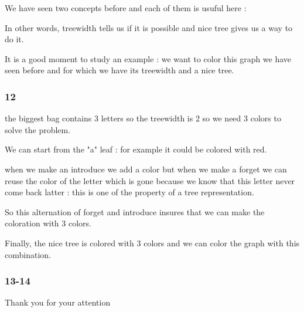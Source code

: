 \documentclass[a4paper, 10pt,french,landscape]{article}
\begin{document}
\begin{multicols}{3}
We have seen two concepts before and each of them is usuful here : 


In other words, treewidth tells us if it is possible and nice tree gives us a way to do it.

It is a good moment to study an example : we want to color this graph we have seen before and for which we have its treewidth and a nice tree.


\subsubsection*{ 12}



the biggest bag contains 3 letters so the treewidth is 2 so we need 3 colors to solve the problem.

We can start from the "a" leaf : for example it could be colored with red.

when we make an introduce we add a color but when we make a forget we can reuse the color of the letter which is gone because we know that this letter never come back latter : this is one of the property of a tree representation.

So this alternation of forget and introduce insures that we can make the coloration with 3 colors.


Finally, the nice tree is colored with 3 colors and we can color the graph with this combination.



\subsubsection*{ 13-14}





Thank you for your attention
\end{multicols}
\end{document}
